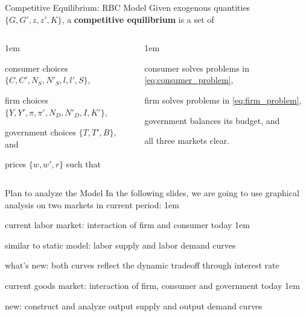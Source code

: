 \documentclass[11pt,aspectratio=43,usenames,dvipsnames]{beamer}
\newcommand{\orange}[1]{\textcolor{BurntOrange}{#1}}
\newcommand{\green}[1]{\textcolor{OliveGreen}{#1}}
\let\olditemize=\itemize
\let\endolditemize=\enditemize
\renewenvironment{itemize}{\olditemize \itemsep1em}{\endolditemize}
\let\oldenumerate=\enumerate
\let\endoldenumerate=\endenumerate
\renewenvironment{enumerate}{\oldenumerate \itemsep1em}{ \endoldenumerate}
\theoremstyle{definition}
\begin{document}
\begin{frame}{Competitive Equilibrium: RBC Model}
\label{slide:Competitive_Equilibrium__RBC_Model}
Given exogenous quantities \orange{$\{ G, G', z, z', K \}$}, a \textbf{competitive equilibrium} is a set of
\begin{columns}
    \begin{column}{0.5\textwidth}
        \begin{enumerate}
            \item consumer choices \green{$\{ C, C', N_{S}, N'_{S}, l, l', S \}$},
            \item firm choices \green{ $ \{ Y, Y', \pi, \pi', N_{D}, N'_{D}, I, K' \} $},
            \item government choices \green{ $ \{ T, T', B \} $}, and
            \item prices \green{ $ \{ w, w', r \} $}
        \end{enumerate}
        such that
    \end{column}
    \begin{column}{0.5\textwidth}
        \begin{enumerate}
            \item consumer solves problems in \eqref{eq:consumer_problem},
            \item firm solves problems in \eqref{eq:firm_problem},
            \item government balances its budget, and
            \item all three markets clear.
        \end{enumerate}
    \end{column}
\end{columns}
\end{frame}

\begin{frame}{Plan to analyze the Model}
\label{slide:Plan_to_analyze_the_Model}
    In the following slides, we are going to use graphical analysis on \alert{two markets} in \alert{current period}:
    \begin{enumerate}
        \item \alert{current labor market}: interaction of firm and consumer today
        \begin{itemize}
            \item similar to static model: \alert{labor supply} and \alert{labor demand} curves
            \item what's new: both curves reflect the dynamic tradeoff through interest rate
        \end{itemize}
        \item \alert{current goods market}: interaction of firm, consumer and government today
        \begin{itemize}
            \item new: construct and analyze \alert{output supply} and \alert{output demand} curves
        \end{itemize}
    \end{enumerate}
\end{frame}
\end{document}
